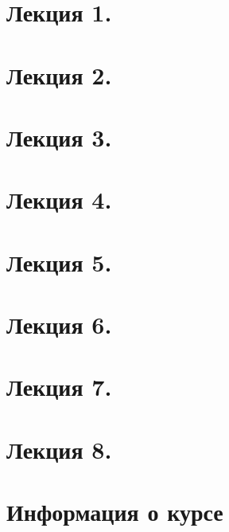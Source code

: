 \newpage
\section{Лекция 1.}


\newpage
\section{Лекция 2.}


\newpage
\section{Лекция 3.}


\newpage
\section{Лекция 4.}


\newpage
\section{Лекция 5.}


\newpage
\section{Лекция 6.}


\newpage
\section{Лекция 7.}


\newpage
\section{Лекция 8.}





\newpage
\section{Информация о курсе}
